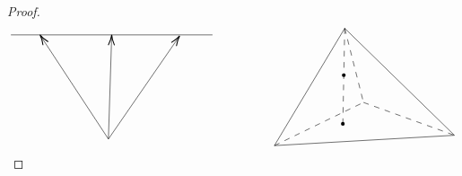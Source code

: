 \documentclass{article}
\begin{document}
\begin{proof}
\[\begin{tikzpicture}[x=0.75pt,y=0.75pt,yscale=-1,xscale=1]
    \draw    (65.11,73.22) -- (280.11,73.22) ;
    \draw    (169.11,184.22) -- (97.21,74.89) ;
    \draw [shift={(96.11,73.22)}, rotate = 56.67] [color={rgb, 255:red, 0; green, 0; blue, 0 }  ][line width=0.75]    (10.93,-3.29) .. controls (6.95,-1.4) and (3.31,-0.3) .. (0,0) .. controls (3.31,0.3) and (6.95,1.4) .. (10.93,3.29)   ;
    \draw    (169.11,184.22) -- (243.97,75.87) ;
    \draw [shift={(245.11,74.22)}, rotate = 124.64] [color={rgb, 255:red, 0; green, 0; blue, 0 }  ][line width=0.75]    (10.93,-3.29) .. controls (6.95,-1.4) and (3.31,-0.3) .. (0,0) .. controls (3.31,0.3) and (6.95,1.4) .. (10.93,3.29)   ;
    \draw    (169.11,184.22) -- (172.55,75.22) ;
    \draw [shift={(172.61,73.22)}, rotate = 91.81] [color={rgb, 255:red, 0; green, 0; blue, 0 }  ][line width=0.75]    (10.93,-3.29) .. controls (6.95,-1.4) and (3.31,-0.3) .. (0,0) .. controls (3.31,0.3) and (6.95,1.4) .. (10.93,3.29)   ;
    \draw    (421.11,66.22) -- (346.11,191.22) ;
    \draw    (421.11,66.22) -- (538.11,180.22) ;
    \draw    (346.11,191.22) -- (538.11,180.22) ;
    \draw  [dash pattern={on 4.5pt off 4.5pt}]  (421.11,66.22) -- (441.11,145.22) ;
    \draw  [dash pattern={on 4.5pt off 4.5pt}]  (346.11,191.22) -- (441.11,145.22) ;
    \draw  [dash pattern={on 4.5pt off 4.5pt}]  (441.11,145.22) -- (538.11,180.22) ;
    \draw  [dash pattern={on 4.5pt off 4.5pt}]  (421.11,66.22) -- (419.11,167.22) ;
    \draw  [line width=3] [line join = round][line cap = round] (420.11,116.22) .. controls (420.11,116.22) and (420.11,116.22) .. (420.11,116.22) ;
    \draw  [line width=3] [line join = round][line cap = round] (419.11,168) .. controls (419.11,168) and (419.11,168) .. (419.11,168) ;
    

\end{tikzpicture}\]
\end{proof}
\end{document}

